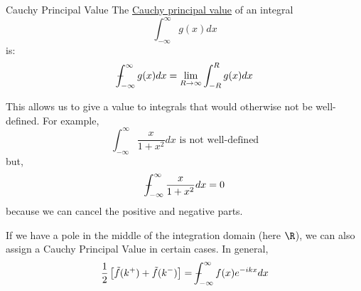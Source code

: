 \documentclass[../Main.tex]{subfiles}
\begin{document}
\begin{definition}{Cauchy Principal Value}
    The \underline{Cauchy principal value} of an integral
    \begin{equation*}
        \int_{-\infty}^{\infty} g(x) dx
    \end{equation*}
    is:
    \begin{equation*}
        \dashint_{-\infty}^\infty g(x) dx = \lim_{R \to \infty} \int_{-R}^R g(x) dx
    \end{equation*}
\end{definition}
This allows us to give a value to integrals that would otherwise not be well-defined. For example,
\begin{equation*}
    \int_{-\infty}^{\infty} \frac{x}{1+x^2} dx \text{ is not well-defined}
\end{equation*}
but,
\begin{equation*}
    \dashint_{-\infty}^{\infty} \frac{x}{1+x^2} dx = 0
\end{equation*}
because we can cancel the positive and negative parts.

If we have a pole in the middle of the integration domain (here $\R$), we can also assign a Cauchy Principal Value in certain cases. In general,
\begin{equation*}
    \frac12 \left[\ft{f}(k^+) + \ft{f}(k^-)\right] = \dashint_{-\infty}^{\infty} f(x) e^{-ikx} dx 
\end{equation*}
\end{document}
